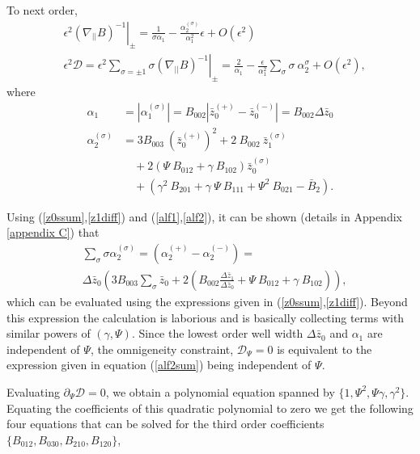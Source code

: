 \documentclass[aip,pop,reprint]{revtex4-1}
\newcommand*\at[2]{\left.#1\right|_{#2}}
\newcommand*{\cD}{\mathcal{D}}
\newcommand*{\ep}{\epsilon}
\newcommand*{\dpl}{\nabla_{||}}
\newcommand*{\zb}{\bar{z}}
\newcommand*{\zbs}{\zb^{(\sigma)}}
\newcommand*{\zbp}{\zb^{(+)}}
\newcommand*{\zbm}{\zb^{(-)}}
\newcommand*{\Bb}{\bar{B}}
\newcommand*{\lbr}{\left(}
\newcommand*{\rbr}{\right)}
\begin{document}
To next order,
\begin{subequations}
\begin{align}
&\ep^2\at{(\dpl B)^{-1}}{\pm}= \frac{1}{\sigma\alpha_1}  -\frac{\alpha^{(\sigma)}_2}{\alpha_1^2}\ep+O(\epsilon^{2})\\
&\ep^2\cD=\ep^2\sum_{\sigma=\pm 1} \sigma \at{(\dpl B)^{-1}}{\pm}=\frac{2}{\alpha_1}-\frac{\epsilon}{\alpha_1^2} \sum_\sigma \sigma\:\alpha^{\sigma}_2 +O(\epsilon^{2}), \label{cDm1}
\end{align}
\end{subequations}
where
\begin{subequations}
\begin{align}
\alpha_1&=|\alpha^{(\sigma)}_1|= B_{002}|\zbp_0-\zbm_0|= B_{002}\Delta \zb_0 \label{alf1}\\
\alpha^{(\sigma)}_2&= 3 B_{003}\:(\zbp_0)^2+2\:B_{002}\:\zbs_1\label{alf2}\\
&\quad+2(\Psi\: B_{012}+\gamma\: B_{102})\zbs_0 \nonumber \\
&\quad+(\gamma^2\: B_{201}+ \gamma\:\Psi\: B_{111}+\Psi^2\: B_{021} -\Bb_2).
\nonumber
\end{align}
\end{subequations}

Using (\ref{z0ssum},\ref{z1diff}) and (\ref{alf1},\ref{alf2}), it can be shown (details in Appendix \ref{appendix C}) that
\begin{subequations}
\begin{align}
&\sum_\sigma \sigma\alpha^{(\sigma)}_2 = (\alpha^{(+)}_2-\alpha^{(-)}_2)= \label{alf2sum}\\
&\Delta \zb_0 \lbr 3 B_{003} \sum_\sigma \zb_0+2\lbr B_{002} \frac{\Delta \zb_1}{\Delta \zb_0}+\Psi\: B_{012} +\gamma\: B_{102}\rbr \rbr , \nonumber
\end{align}
\end{subequations} 
which can be evaluated using the expressions given in (\ref{z0ssum},\ref{z1diff}). Beyond this expression the calculation is laborious and is basically collecting terms with similar powers of $(\gamma,\Psi)$. Since the lowest order well width $\Delta\zb_0$ and $\alpha_1$ are independent of $\Psi$, the omnigeneity constraint, $\cD_\Psi=0$ is equivalent to the expression given in equation (\ref{alf2sum}) being independent of $\Psi$.

Evaluating $\partial_\Psi\cD=0$, we obtain a polynomial equation spanned by $\{1,\Psi^2,\Psi\gamma, \gamma^2\}$. Equating the coefficients of this quadratic polynomial to zero we get the following four equations that can be solved for the third order coefficients $\{B_{012},B_{030},B_{210},B_{120}\}$,
\end{document}
